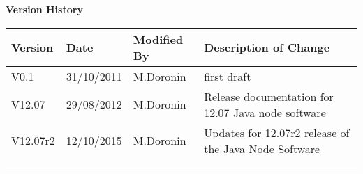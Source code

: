 {\begin{titlepage}
\end{titlepage}

\noindent \textbf{Version History}

\textbf{}

\noindent \begin{tabular}{|l|l|l|l|} 
\hline 
\textbf{Version} & \textbf{Date} & \textbf{Modified By} & \textbf{Description of Change} \\ \hline 
V0.1 & 31/10/2011 & M.Doronin & first draft \\ \hline 
V12.07 & 29/08/2012 & M.Doronin & Release documentation for 12.07 Java node software \\ \hline 
V12.07r2 & 12/10/2015 & M.Doronin & Updates for 12.07r2 release of the Java Node Software \\ \hline
 &  &  &  \\ \hline 
 &  &  &  \\ \hline 
\end{tabular}



}